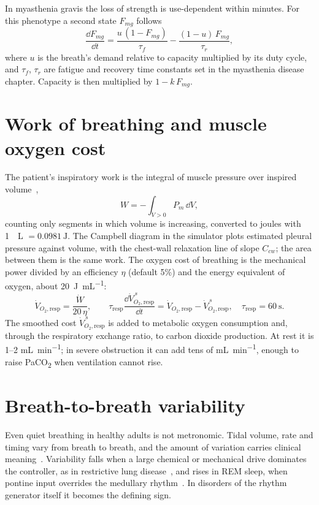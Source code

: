 In myasthenia gravis the loss of strength is use-dependent within minutes. For this phenotype a second state $F_{mg}$ follows
\begin{equation}
\frac{\dd F_{mg}}{\dd t} = \frac{u\,(1-F_{mg})}{\tau_f} - \frac{(1-u)\,F_{mg}}{\tau_r},
\label{eq:mus-mg}
\end{equation}
where $u$ is the breath's demand relative to capacity multiplied by its duty cycle, and $\tau_f$, $\tau_r$ are fatigue and recovery time constants set in the myasthenia disease chapter. Capacity is then multiplied by $1 - k\,F_{mg}$.

\section{Work of breathing and muscle oxygen cost}
\label{sec:mus-wob}
The patient's inspiratory work is the integral of muscle pressure over inspired volume~\citep{otis1954,campbell1958},
\begin{equation}
W = -\int_{\dot V>0} P_m\,\dd V,
\label{eq:mus-wob}
\end{equation}
counting only segments in which volume is increasing, converted to joules with \SI{1}{\cmH\liter} $= \SI{0.0981}{\joule}$. The Campbell diagram in the simulator plots estimated pleural pressure against volume, with the chest-wall relaxation line of slope $C_{cw}$; the area between them is the same work. The oxygen cost of breathing is the mechanical power divided by an efficiency $\eta$ (default 5\%) and the energy equivalent of oxygen, about \SI{20}{\joule\per\milli\liter}:
\begin{equation}
\dot V_{O_2,\mathrm{resp}} = \frac{\dot W}{20\,\eta},\qquad
\tau_{\mathrm{resp}}\frac{\dd \dot V_{O_2,\mathrm{resp}}^{\,s}}{\dd t} = \dot V_{O_2,\mathrm{resp}} - \dot V_{O_2,\mathrm{resp}}^{\,s},\quad \tau_{\mathrm{resp}} = \SI{60}{\second}.
\label{eq:mus-vo2}
\end{equation}
The smoothed cost $\dot V_{O_2,\mathrm{resp}}^{\,s}$ is added to metabolic oxygen consumption and, through the respiratory exchange ratio, to carbon dioxide production. At rest it is 1--2 \si{\milli\liter\per\minute}; in severe obstruction it can add tens of \si{\milli\liter\per\minute}, enough to raise PaCO\textsubscript{2} when ventilation cannot rise.

\section{Breath-to-breath variability}
\label{sec:mus-cv}
Even quiet breathing in healthy adults is not metronomic. Tidal volume, rate and timing vary from breath to breath, and the amount of variation carries clinical meaning~\citep{wysocki2006}. Variability falls when a large chemical or mechanical drive dominates the controller, as in restrictive lung disease~\citep{brack2002}, and rises in REM sleep, when pontine input overrides the medullary rhythm~\citep{orem2000}. In disorders of the rhythm generator itself it becomes the defining sign.

